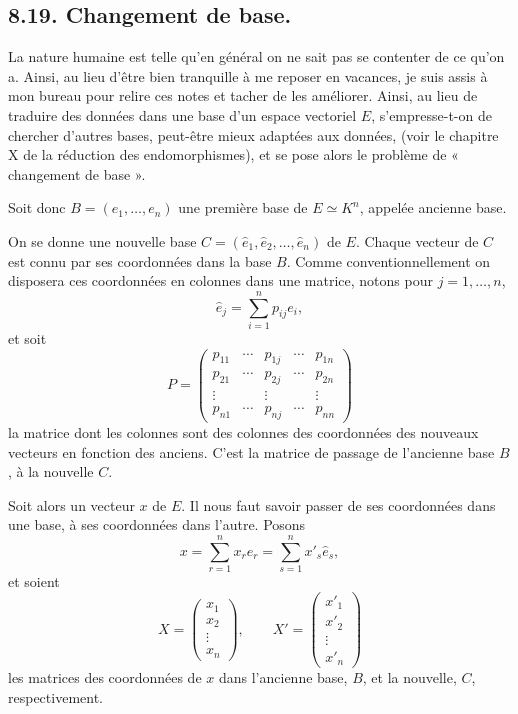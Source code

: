 \subsection*{8.19. Changement de base.}
La nature humaine est telle qu'en général on ne sait pas se contenter de ce qu'on a. Ainsi, au lieu d'être bien tranquille à me reposer en vacances, je suis assis à mon bureau pour relire ces notes et tacher de les améliorer. Ainsi, au lieu de traduire des données dans une base d'un espace vectoriel $E$, s'empresse-t-on de chercher d'autres bases, peut-être mieux adaptées aux données, (voir le chapitre X de la réduction des endomorphismes), et se pose alors le problème de « changement de base ».

Soit donc $B=(e_1,\ldots,e_n)$ une première base de $E\simeq K^n$, appelée ancienne base.

On se donne une nouvelle base $C=(\hat e_1,\hat e_2,\ldots,\hat e_n)$ de $E$. Chaque vecteur de $C$ est connu par ses coordonnées dans la base $B$. Comme conventionnellement on disposera ces coordonnées en colonnes dans une matrice, notons pour $j=1,\ldots,n$,
\[
\hat e_j=\sum_{i=1}^n p_{ij}e_i,
\]
et soit
\[
P=\begin{pmatrix}
p_{11}&\cdots&p_{1j}&\cdots&p_{1n}\\
p_{21}&\cdots&p_{2j}&\cdots&p_{2n}\\
\vdots&&\vdots&&\vdots\\
p_{n1}&\cdots&p_{nj}&\cdots&p_{nn}
\end{pmatrix}
\]
la matrice dont les colonnes sont des colonnes des coordonnées des nouveaux vecteurs en fonction des anciens. C'est la matrice de passage de l'ancienne base $B$, à la nouvelle $C$.

Soit alors un vecteur $x$ de $E$. Il nous faut savoir passer de ses coordonnées dans une base, à ses coordonnées dans l'autre. Posons
\[
\tag{8.20}
x=\sum_{r=1}^n x_re_r=\sum_{s=1}^n x'_s\hat e_s,
\]
et soient
\[
X=\begin{pmatrix}x_1\\x_2\\\vdots\\x_n\end{pmatrix},\qquad
X'=\begin{pmatrix}x'_1\\x'_2\\\vdots\\x'_n\end{pmatrix}
\]
les matrices des coordonnées de $x$ dans l'ancienne base, $B$, et la nouvelle, $C$, respectivement.

